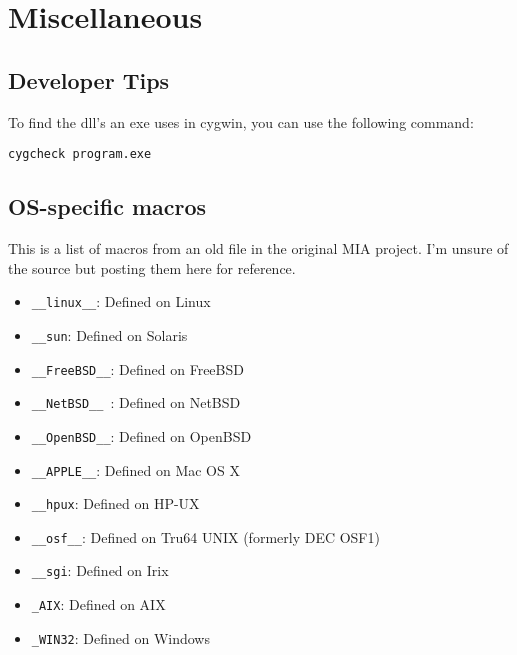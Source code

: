 \chapter{Miscellaneous} \label{ch:miscellaneous}
\pagestyle{fancy}



\section{Developer Tips}

To find the dll's an exe uses in cygwin, you can use the following command:
\begin{lstlisting}[style=terminalstyle]
cygcheck program.exe
\end{lstlisting}


\section{OS-specific macros}
This is a list of macros from an old file in the original MIA project. I'm unsure of the source but posting them here for reference.
\begin{multicols}{2}
\begin{itemize}
\item \texttt{\_\_linux\_\_}:   Defined on Linux
\item \texttt{\_\_sun}:         Defined on Solaris
\item \texttt{\_\_FreeBSD\_\_}: Defined on FreeBSD
\item \texttt{\_\_NetBSD\_\_ }: Defined on NetBSD
\item \texttt{\_\_OpenBSD\_\_}: Defined on OpenBSD
\item \texttt{\_\_APPLE\_\_}:   Defined on Mac OS X
\item \texttt{\_\_hpux}:        Defined on HP-UX
\item \texttt{\_\_osf\_\_}:     Defined on Tru64 UNIX (formerly DEC OSF1)
\item \texttt{\_\_sgi}:         Defined on Irix
\item \texttt{\_AIX}:           Defined on AIX
\item \texttt{\_WIN32}:			Defined on Windows
\end{itemize}
\end{multicols}